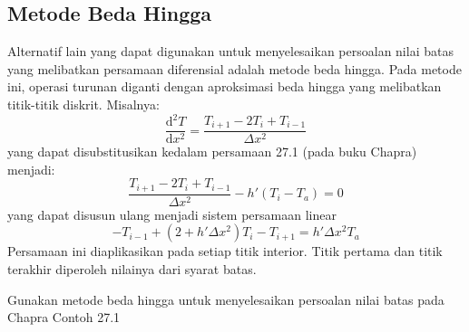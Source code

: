 \subsection{Metode Beda Hingga}

Alternatif lain yang dapat digunakan untuk menyelesaikan persoalan nilai
batas yang melibatkan persamaan diferensial adalah metode beda hingga.
Pada metode ini, operasi turunan diganti dengan aproksimasi
beda hingga yang melibatkan titik-titik diskrit.
Misalnya:
\begin{equation*}
\frac{\mathrm{d}^2 T}{\mathrm{d}x^2} = \frac{T_{i+1} - 2T_{i} + T_{i-1}}{\Delta x^2}
\end{equation*} 
yang dapat disubstitusikan kedalam persamaan 27.1 (pada buku Chapra) menjadi:
\begin{equation*}
\frac{T_{i+1} - 2T_{i} + T_{i-1}}{\Delta x^2} - h'(T_i - T_a) = 0
\end{equation*}
yang dapat disusun ulang menjadi sistem persamaan linear
\begin{equation*}
-T_{i-1} + (2 + h'\Delta x^2)T_i - T_{i+1} = h' \Delta x^2 T_a
\end{equation*}
Persamaan ini diaplikasikan pada setiap titik interior. Titik pertama dan
titik terakhir diperoleh nilainya dari syarat batas.


\begin{soal}
Gunakan metode beda hingga untuk menyelesaikan persoalan nilai
batas pada Chapra Contoh 27.1
\end{soal}

